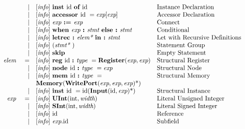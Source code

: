 \documentclass[12pt]{article}
\begin{document}
\[\begin{array}{rrll}
                &\vert &[\text{\em info}]\  \text{\bf inst\ } \text{id } \text{\bf of\ } \text{id }                                               &\text{Instance Declaration}\\
                &\vert &[\text{\em info}]\  \text{\bf accessor\ } \text{id } = \text{\em exp}[\text{\em exp}]                                &\text{Accessor Declaration}\\
                &\vert &[\text{\em info}]\  \text{\em exp\ } \text{\bf :=\ } \text{\em exp\ }                                               &\text{Connect}\\
                &\vert &[\text{\em info}]\  \text{\bf when\ } \text{\em exp\ } \text{\bf :\ } \text{\em stmt\ } \text{\bf else :\ } \text{\em stmt\ }               &\text{Conditional}\\
                &\vert &[\text{\em info}]\  \text{\bf letrec :\ } \text{\em elem*\ } \text{\bf in :\ } \text{\em stmt\ }                            &\text{Let with Recursive Definitions}\\
                &\vert &[\text{\em info}]\  (\text{\em stmt*\ })                                                            &\text{Statement Group}\\
                &\vert &[\text{\em info}]\  \text{\bf skip\ }                                                               &\text{Empty Statement}\\
\text{\em elem\ }       &=     &[\text{\em info}]\  \text{\bf reg\ } \text{id } \text{\bf :\ } \text{\em type\ } = \text{\bf Register}(\text{\em exp}, \text{\em exp})    &\text{Structural Register}\\
                &\vert &[\text{\em info}]\  \text{\bf node\ } \text{id } \text{\bf :\ } \text{\em type\ } = \text{\em exp\ }                               &\text{Structural Node}\\
                &\vert &[\text{\em info}]\  \text{\bf mem\ } \text{id } \text{\bf :\ } \text{\em type\ } =                                         &\text{Structural Memory}\\
                &      &\text{\bf Memory}(\text{\bf WritePort}(\text{\em exp}, \text{\em exp}, \text{\em exp})\text{*})  &\\
                &\vert &[\text{\em info}]\  \text{\bf inst\ } \text{id } = \text{id}(\text{\bf Input}(\text{id},\text{\em exp})\text{*})               &\text{Structural Instance}\\
\text{\em exp\ }        &=     &[\text{\em info}]\  \text{\bf UInt}(\text{int}, \text{\em width})                                          &\text{Literal Unsigned Integer}\\
                &\vert &[\text{\em info}]\  \text{\bf SInt}(\text{int}, \text{\em width})                                          &\text{Literal Signed Integer}\\
                &\vert &[\text{\em info}]\  \text{id }                                                                     &\text{Reference}\\
                &\vert &[\text{\em info}]\  \text{\em exp}.\text{id }                                                           &\text{Subfield}\\

\end{array}\]
\end{document}

